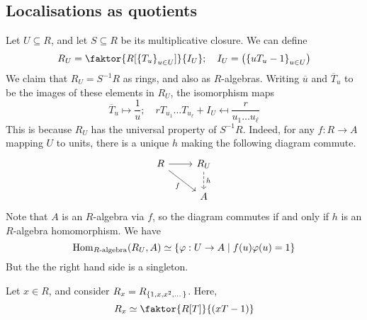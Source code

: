 \subsection{Localisations as quotients}
Let \( U \subseteq R \), and let \( S \subseteq R \) be its multiplicative closure.
We can define
\[ R_U = \faktor{R[\qty{T_u}_{u \in U}]}{I_U};\quad I_U = \qty(\qty{u T_u - 1}_{u \in U}) \]
We claim that \( R_U = S^{-1}R \) as rings, and also as \( R \)-algebras.
Writing \( \overline u \) and \( \overline T_u \) to be the images of these elements in \( R_U \), the isomorphism maps
\[ \overline T_u \mapsto \frac{1}{u};\quad r T_{u_1} \dots T_{u_\ell} + I_U \mapsfrom \frac{r}{u_1 \dots u_\ell} \]
This is because \( R_U \) has the universal property of \( S^{-1}R \).
Indeed, for any \( f : R \to A \) mapping \( U \) to units, there is a unique \( h \) making the following diagram commute.
\[\begin{tikzcd}
	R & {R_U} \\
	& A
	\arrow[from=1-1, to=1-2]
	\arrow["f"', from=1-1, to=2-2]
	\arrow["h", dashed, from=1-2, to=2-2]
\end{tikzcd}\]
Note that \( A \) is an \( R \)-algebra via \( f \), so the diagram commutes if and only if \( h \) is an \( R \)-algebra homomorphism.
We have
\[ \operatorname{Hom}_{R\text{-algebra}}(R_U, A) \simeq \qty{\varphi : U \to A \mid f(u) \varphi(u) = 1} \]
But the the right hand side is a singleton.
\begin{example}
    Let \( x \in R \), and consider \( R_x = R_{\qty{1, x, x^2, \dots}} \).
    Here,
    \[ R_x \simeq \faktor{R[T]}{(xT - 1)} \]
\end{example}
